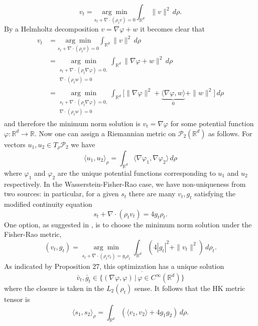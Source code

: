 \documentclass{article}
\begin{document}
\begin{equation}
    v_t = \underset{s_t +\nabla\cdot (\rho_tv) = 0}{\arg\min}\int_{\mathbb{R}^d}\|v\|^2\,d\rho.
\end{equation}
By a Helmholtz decomposition $v = \nabla \varphi + w$ it becomes clear that
\begin{align}
    v_t &= \underset{s_t +\nabla\cdot (\rho_tv) = 0}{\arg\min}\int_{\mathbb{R}^d}\|v\|^2\,d\rho \\
    &= \underset{\substack{s_t +\nabla\cdot (\rho_t\nabla\varphi) = 0, \\\nabla\cdot(\rho_tw) = 0}}{\arg\min}\int_{\mathbb{R}^d}\|\nabla\varphi + w\|^2\,d\rho \\
    &= \underset{\substack{s_t +\nabla\cdot (\rho_t\nabla\varphi) = 0, \\\nabla\cdot(\rho_tw) = 0}}{\arg\min}\int_{\mathbb{R}^d}\Big[\|\nabla\varphi\|^2 + \underbrace{\langle\nabla\varphi, w\rangle}_{0} + \|w\|^2\Big]\,d\rho
\end{align}
and therefore the minimum norm solution is $v_t = \nabla\varphi$ for some potential function $\varphi: \mathbb{R}^d\rightarrow\mathbb{R}$. Now one can assign a Riemannian metric on $\mathcal{P}_2(\mathbb{R}^d)$ as follows. For vectors $u_1, u_2 \in T_{\rho}\mathcal{P}_2$ we have
\begin{equation}
    \langle u_1, u_2\rangle_{\rho} = \int_{\mathbb{R}^d}\langle\nabla\varphi_1, \nabla\varphi_2\rangle\, d\rho
\end{equation}
where $\varphi_1$ and $\varphi_2$ are the unique potential functions corresponding to $u_1$ and $u_2$ respectively. In the Wasserstein-Fisher-Rao case, we have non-uniqueness from two sources: in particular, for a given $s_t$ there are many $v_t, g_t$ satisfying the modified continuity equation
\[s_t + \nabla \cdot (\rho_tv_t) = 4g_t\rho_t.\]
One option, as suggested in \cite{vialard2015wasserstein, chizat2018interpolating, lambert2022variational}, is to choose the minimum norm solution under the Fisher-Rao metric,
\[(v_t, g_t) = \underset{\substack{s_t +\nabla\cdot (\rho_tv_t) = g_t\rho_t}}{\arg\min}\int_{\mathbb{R}^d} \left(4|g_t|^2 + \|v_t\|^2\right)\,d\rho_t.\]
As indicated by \citet{clancy2021interpolating} Proposition 27, this optimization has a unique solution 
\begin{equation}
\bar{v}_t, \bar{g}_t \in \overline{\{(\nabla\varphi, \varphi) \, | \, \varphi \in C^{\infty}(\mathbb{R}^d) \}} \label{eq: HK tangent vectors}
\end{equation}
where the closure is taken in the $L_2(\rho_t)$ sense. It follows that the HK metric tensor is
\begin{equation}
    \langle s_1, s_2 \rangle_{\rho} = \int_{\mathbb{R}^d} \left(\langle v_1, v_2\rangle + 4g_1g_2\right)\,d\rho.
\end{equation}
\end{document}
